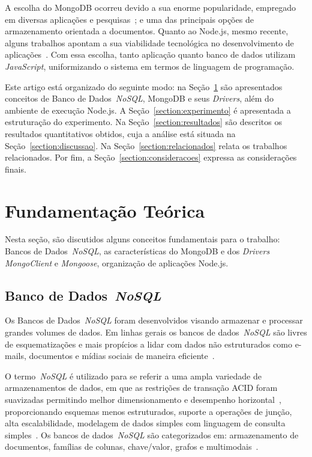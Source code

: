 \documentclass[12pt]{article}
\begin{document}
A escolha do MongoDB ocorreu devido a sua enorme popularidade, empregado em diversas aplicações e pesquisas~\cite{patil:2017,jung:2015,ongo:2018,kanade2014study}; e uma das principais opções de armazenamento orientada a documentos. Quanto ao Node.js, mesmo recente, alguns trabalhos apontam a sua viabilidade tecnológica no desenvolvimento de aplicações~\cite{chaniotis2015node}. Com essa escolha, tanto aplicação quanto banco de dados utilizam \textit{JavaScript}, uniformizando o sistema em termos de linguagem de programação.

Este artigo está organizado do seguinte modo: na Seção~\ref{section:fundamentacao} são apresentados conceitos de Banco de Dados~\emph{NoSQL}, MongoDB e seus \emph{Drivers}, além do ambiente de execução Node.js. 
A Seção~\ref{section:experimento} é apresentada a estruturação do experimento. 
Na Seção~\ref{section:resultados} são descritos os resultados quantitativos obtidos, cuja a análise está situada na Seção~\ref{section:discussao}. Na Seção~\ref{section:relacionados} relata os trabalhos relacionados. Por fim, a Seção~\ref{section:consideracoes} expressa as considerações finais.

\section{Fundamentação Teórica}
\label{section:fundamentacao}

Nesta seção, são discutidos alguns conceitos fundamentais para o trabalho: Bancos de Dados~\emph{NoSQL}, as características do MongoDB e dos \emph{Drivers} \emph{MongoClient} e \emph{Mongoose}, organização de aplicações Node.js. 

\subsection{Banco de Dados~\emph{NoSQL}}
\label{subsection:nao-relacional}

Os Bancos de Dados~\emph{NoSQL} foram desenvolvidos visando armazenar e processar grandes volumes de dados. 
Em linhas gerais os bancos de dados~\emph{NoSQL} são livres de esquematizações e mais propícios a lidar com dados não estruturados como e-mails, documentos e mídias sociais de maneira eficiente~\cite{mohamed:2014,ramesh:2016}.

O termo~\emph{NoSQL} é utilizado para se referir a uma ampla variedade de armazenamentos de dados, em que as restrições de transação ACID foram suavizadas permitindo melhor dimensionamento e desempenho horizontal~\cite{rafique:2018}, proporcionando esquemas menos estruturados, suporte a operações de junção, alta escalabilidade, modelagem de dados simples com linguagem de consulta simples~\cite{ramesh:2016}. 
Os bancos de dados~\emph{NoSQL} são categorizados em: armazenamento de documentos, famílias de colunas, chave/valor, grafos e multimodais~\cite{aparicio:2016}.
\end{document}
